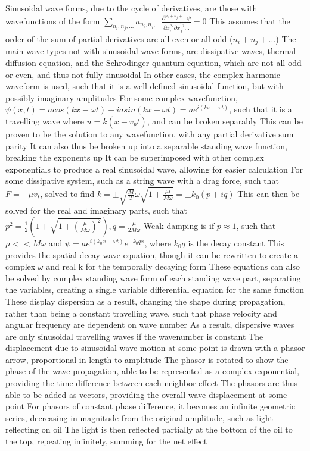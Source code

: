 \documentclass[11 pt, twoside]{article}
\newenvironment{outline*}
{
	\begin{outline}[enumerate]
	}
	{\end{outline}
}
\begin{document}
\begin{outline*}
\1 Sinusoidal wave forms, due to the cycle of derivatives, are those with wavefunctions of the form $\sum_{n_i, n_j, \dots} a_{n_i, n_j, \dots} \frac{\partial^{n_i + n_j + \dots}\psi}{\partial x_i^{n_i} \partial x_j^{n_j} \dots} = 0$
\2 This assumes that the order of the sum of partial derivatives are all even or all odd ($n_i + n_j + \dots$)
\2 The main wave types not with sinusoidal wave forms, are dissipative waves, thermal diffusion equation, and the Schrodinger quantum equation, which are not all odd or even, and thus not fully sinusoidal
\3 In other cases, the complex harmonic waveform is used, such that it is a well-defined sinusoidal function, but with possibly imaginary amplitudes
\2 For some complex wavefunction, $\psi(x, t) = acos(kx - \omega t) + iasin(kx - \omega t) = ae^{i(kx - \omega t)}$, such that it is a travelling wave where $u = k(x - v_pt)$, and can be broken separably
\3 This can be proven to be the solution to any wavefunction, with any partial derivative sum parity
\3 It can also thus be broken up into a separable standing wave function, breaking the exponents up
\3 It can be superimposed with other complex exponentials to produce a real sinusoidal wave, allowing for easier calculation
\2 For some dissipative system, such as a string wave with a drag force, such that $F = -\mu v_t$, solved to find $k = \pm \sqrt{\frac{M}{T}}\omega\sqrt{1 + \frac{\mu i}{M \omega}} = \pm k_0(p + iq)$
\3 This can then be solved for the real and imaginary parts, such that $p^2 = \frac{1}{2}(1 + \sqrt{1 + (\frac{\mu}{M\omega})^2}), q = \frac{\mu}{2M\omega}$
\3 Weak damping is if $p \approx 1$, such that $\mu << M\omega$ and $\psi = ae^{i(k_0x - \omega t)}e^{-k_0qx}$, where $k_0q$ is the decay constant
\3 This provides the spatial decay wave equation, though it can be rewritten to create a complex $\omega$ and real k for the temporally decaying form
\3 These equations can also be solved by complex standing wave form of each standing wave part, separating the variables, creating a single variable differential equation for the same function
\3 These display dispersion as a result, changing the shape during propagation, rather than being a constant travelling wave, such that phase velocity and angular frequency are dependent on wave number
\4 As a result, dispersive waves are only sinusoidal travelling waves if the wavenumber is constant
\1 The displacement due to sinusoidal wave motion at some point is drawn with a phasor arrow, proportional in length to amplitude
\2 The phasor is rotated to show the phase of the wave propagation, able to be represented as a complex exponential, providing the time difference between each neighbor effect
\2 The phasors are thus able to be added as vectors, providing the overall wave displacement at some point
\3 For phasors of constant phase difference, it becomes an infinite geometric series, decreasing in magnitude from the original amplitude, such as light reflecting on oil
\3 The light is then reflected partially at the bottom of the oil to the top, repeating infinitely, summing for the net effect
\end{outline*}
\end{document}
